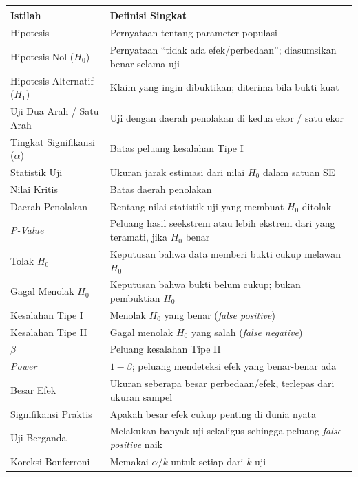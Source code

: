 \documentclass[
  indonesian,
  letterpaper,
]{book}
\newcounter{none} %
\begin{document}
{\def\LTcaptype{none} %
\begin{longtable}[]{@{}
  >{\raggedright\arraybackslash}p{}
  >{\raggedright\arraybackslash}p{}@{}}
\toprule\noalign{}
\begin{minipage}[b]{\linewidth}\raggedright
Istilah
\end{minipage} & \begin{minipage}[b]{\linewidth}\raggedright
Definisi Singkat
\end{minipage} \\
\midrule\noalign{}
\endhead
\bottomrule\noalign{}
\endlastfoot
Hipotesis & Pernyataan tentang parameter populasi \\
Hipotesis Nol (\(H_0\)) & Pernyataan ``tidak ada efek/perbedaan'';
diasumsikan benar selama uji \\
Hipotesis Alternatif (\(H_1\)) & Klaim yang ingin dibuktikan; diterima
bila bukti kuat \\
Uji Dua Arah / Satu Arah & Uji dengan daerah penolakan di kedua ekor /
satu ekor \\
Tingkat Signifikansi (\(\alpha\)) & Batas peluang kesalahan Tipe I \\
Statistik Uji & Ukuran jarak estimasi dari nilai \(H_0\) dalam satuan
SE \\
Nilai Kritis & Batas daerah penolakan \\
Daerah Penolakan & Rentang nilai statistik uji yang membuat \(H_0\)
ditolak \\
\emph{P-Value} & Peluang hasil seekstrem atau lebih ekstrem dari yang
teramati, jika \(H_0\) benar \\
Tolak \(H_0\) & Keputusan bahwa data memberi bukti cukup melawan
\(H_0\) \\
Gagal Menolak \(H_0\) & Keputusan bahwa bukti belum cukup; bukan
pembuktian \(H_0\) \\
Kesalahan Tipe I & Menolak \(H_0\) yang benar (\emph{false positive}) \\
Kesalahan Tipe II & Gagal menolak \(H_0\) yang salah (\emph{false
negative}) \\
\(\beta\) & Peluang kesalahan Tipe II \\
\emph{Power} & \(1 - \beta\); peluang mendeteksi efek yang benar-benar
ada \\
Besar Efek & Ukuran seberapa besar perbedaan/efek, terlepas dari ukuran
sampel \\
Signifikansi Praktis & Apakah besar efek cukup penting di dunia nyata \\
Uji Berganda & Melakukan banyak uji sekaligus sehingga peluang
\emph{false positive} naik \\
Koreksi Bonferroni & Memakai \(\alpha/k\) untuk setiap dari \(k\) uji \\
\end{longtable}
}
\end{document}
